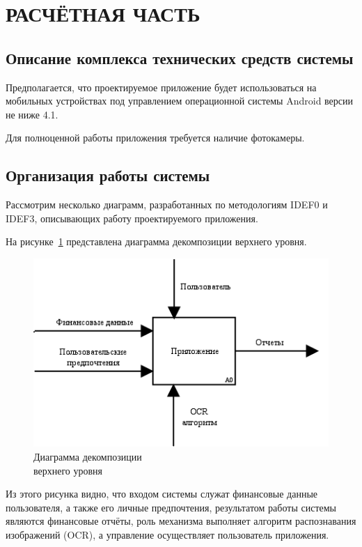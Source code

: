 \section[Расчётная часть]{РАСЧЁТНАЯ ЧАСТЬ}

\subsection{Описание комплекса технических средств системы}

Предполагается, что проектируемое приложение будет использоваться
на мобильных устройствах под управлением операционной системы Android
версии не ниже 4.1.

Для полноценной работы приложения требуется наличие фотокамеры.

\subsection{Организация работы системы}

Рассмотрим несколько диаграмм, разработанных по методологиям IDEF0 и IDEF3,
описывающих работу проектируемого приложения.

На рисунке~\ref{fig:idef0_main} представлена диаграмма декомпозиции
верхнего уровня.

\begin{figure}[h!]
  \centering
  \includegraphics[width=130mm]{pic/idef0_main}
  \caption{Диаграмма декомпозиции \\ верхнего уровня}
  \label{fig:idef0_main}
\end{figure}

Из этого рисунка видно, что входом системы служат финансовые данные пользователя,
а также его личные предпочтения,
результатом работы системы являются финансовые отчёты,
роль механизма выполняет алгоритм распознавания изображений (OCR),
а управление осуществляет пользователь приложения.

